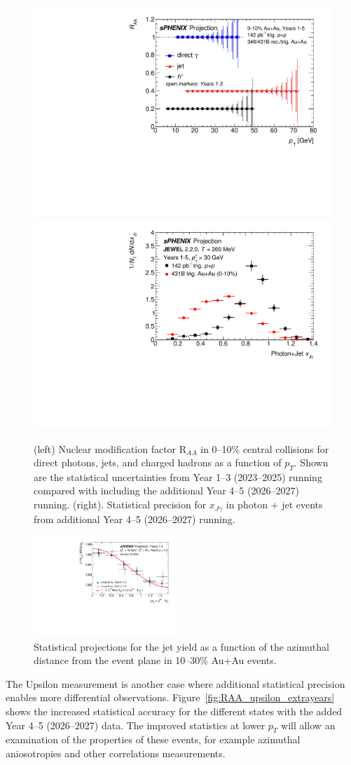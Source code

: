 \begin{figure}
    \centering
    \includegraphics[width=0.48\linewidth]{figs/RAA_jet_2}
    \includegraphics[width=0.48\linewidth]{figs/xJg_2}
    \caption{(left) Nuclear modification factor R$_{AA}$ in 0--10\% central \auau collisions for direct photons, jets, and charged hadrons as a function of $p_T$.   Shown are the statistical uncertainties from Year 1--3 (2023--2025) running compared with including the additional Year 4--5 (2026--2027) running.   (right). Statistical precision for $x_{J\gamma}$ in photon + jet events from additional Year 4--5 (2026--2027) running.}
    \label{fig:RAA_jet_extrayears}
\end{figure}

\begin{figure}[h]
\centering
\includegraphics[width=0.48\textwidth]{figs/jet_dphi_2}
\caption{Statistical projections for the jet yield as a function of the azimuthal distance from the event plane in 10--30\% Au+Au events.}
\label{fig:jet_dphi_proj2}
\end{figure}

The Upsilon measurement is another case where additional statistical precision enables more differential observations.   Figure~\ref{fig:RAA_upsilon_extrayears} shows the increased statistical accuracy for the different states with the added Year 4--5 (2026--2027) data.     The improved statistics at lower $p_T$ will allow an examination of the properties of these events, for example azimuthal aniosotropies and other correlations measurements.

